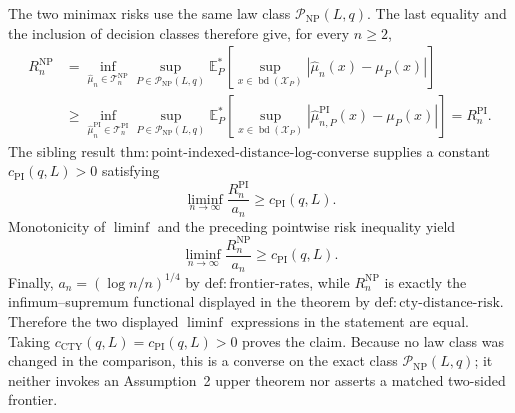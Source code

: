 The two minimax risks use the same law class \(\mathcal P_{\mathrm{NP}}(L,q)\).  The last equality and the inclusion of decision classes therefore give, for every \(n\geq2\),
\[
\begin{aligned}
 R_n^{\mathrm{NP}}
 &=\inf_{\widehat\mu_n\in\mathcal T_n^{\mathrm{NP}}}
   \sup_{P\in\mathcal P_{\mathrm{NP}}(L,q)}
   \mathbb E_P^*\!\left[
     \sup_{x\in\operatorname{bd}(\mathcal X_P)}
     |\widehat\mu_n(x)-\mu_P(x)|
   \right]\\
 &\geq
   \inf_{\widehat\mu_n^{\mathrm{PI}}\in\mathcal T_n^{\mathrm{PI}}}
   \sup_{P\in\mathcal P_{\mathrm{NP}}(L,q)}
   \mathbb E_P^*\!\left[
     \sup_{x\in\operatorname{bd}(\mathcal X_P)}
     |\widehat\mu_{n,P}^{\mathrm{PI}}(x)-\mu_P(x)|
   \right]
 =R_n^{\mathrm{PI}}.
\end{aligned}
\]
The sibling result \(\mathrm{thm:point\text{-}indexed\text{-}distance\text{-}log\text{-}converse}\) supplies a constant \(c_{\mathrm{PI}}(q,L)>0\) satisfying
\[
 \liminf_{n\to\infty}\frac{R_n^{\mathrm{PI}}}{a_n}
 \geq c_{\mathrm{PI}}(q,L).
\]
Monotonicity of \(\liminf\) and the preceding pointwise risk inequality yield
\[
 \liminf_{n\to\infty}\frac{R_n^{\mathrm{NP}}}{a_n}
 \geq c_{\mathrm{PI}}(q,L).
\]
Finally, \(a_n=(\log n/n)^{1/4}\) by \(\mathrm{def:frontier\text{-}rates}\), while \(R_n^{\mathrm{NP}}\) is exactly the infimum--supremum functional displayed in the theorem by \(\mathrm{def:cty\text{-}distance\text{-}risk}\).  Therefore the two displayed \(\liminf\) expressions in the statement are equal.  Taking \(c_{\mathrm{CTY}}(q,L)=c_{\mathrm{PI}}(q,L)>0\) proves the claim.  Because no law class was changed in the comparison, this is a converse on the exact class \(\mathcal P_{\mathrm{NP}}(L,q)\); it neither invokes an Assumption~2 upper theorem nor asserts a matched two-sided frontier.